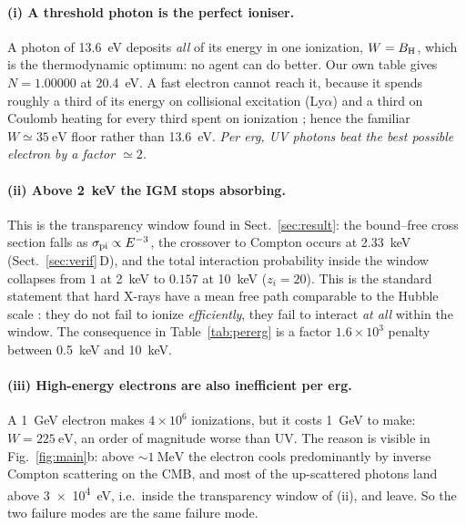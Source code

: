 \documentclass[11pt,a4paper]{article}
\begin{document}
\paragraph{(i) A threshold photon is the perfect ioniser.}
A photon of \SI{13.6}{\electronvolt} deposits \emph{all} of its energy in one
ionization, $W = B_{\rm H}$, which is the thermodynamic optimum: no agent can
do better. Our own table gives $N=1.00000$ at \SI{20.4}{\electronvolt}. A fast
electron cannot reach it, because it spends roughly a third of its energy on
collisional excitation (Ly$\alpha$) and a third on Coulomb heating for every
third spent on ionization \citep{shull85,valdes08,furlanetto10}; hence the
familiar $W\simeq\SI{35}{\electronvolt}$ floor rather than
\SI{13.6}{\electronvolt}. \emph{Per erg, UV photons beat the best possible
electron by a factor $\simeq2$.}

\paragraph{(ii) Above \SI{2}{\kilo\electronvolt} the IGM stops absorbing.}
This is the transparency window found in Sect.~\ref{sec:result}: the
bound--free cross section falls as $\sigma_{\rm pi}\propto E^{-3}$, the
crossover to Compton occurs at \SI{2.33}{\kilo\electronvolt}
(Sect.~\ref{sec:verif}\,D), and the total interaction probability inside the
window collapses from $1$ at \SI{2}{\kilo\electronvolt} to $0.157$ at
\SI{10}{\kilo\electronvolt} ($z_i=20$). This is the standard statement that
hard X-rays have a mean free path comparable to the Hubble scale
\citep{oh01,venkatesan01,mcquinn12,mesinger13}: they do not fail to ionize
\emph{efficiently}, they fail to interact \emph{at all} within the window. The
consequence in Table~\ref{tab:pererg} is a factor $1.6\times10^{3}$ penalty
between \SI{0.5}{\kilo\electronvolt} and \SI{10}{\kilo\electronvolt}.

\paragraph{(iii) High-energy electrons are also inefficient per erg.}
A \SI{1}{\giga\electronvolt} electron makes $4\times10^{6}$ ionizations, but it
costs \SI{1}{\giga\electronvolt} to make: $W=\SI{225}{\electronvolt}$, an order
of magnitude worse than UV. The reason is visible in
Fig.~\ref{fig:main}b: above $\sim\SI{1}{\mega\electronvolt}$ the electron cools
predominantly by inverse Compton scattering on the CMB, and most of the
up-scattered photons land above \SI{3e4}{\electronvolt}, i.e.\ inside the
transparency window of (ii), and leave. So the two failure modes are the same
failure mode.
\end{document}
